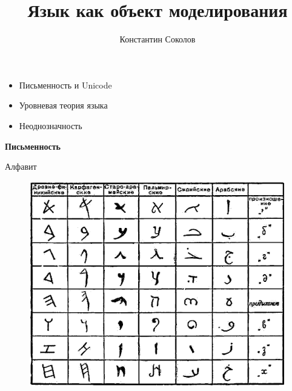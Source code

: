 \documentclass{beamer}
\begin{document}
\title{\large{\sc Язык как объект моделирования}}
\author{Константин Соколов}

\begin{frame}
    \thispagestyle{empty}
    \titlepage
\end{frame}

 

\begin{frame}{}
\begin{itemize}
	\item Письменность и Unicode
	\item Уровневая теория языка
	\item Неоднозначность
\end{itemize}
\end{frame}
 

\begin{frame}{}
\begin{center}
	\textbf{Письменность}
\end{center}
\end{frame}

\begin{frame}{Алфавит}
\begin{figure}[H]
\includegraphics[scale=0.4]{alphabet.png} 
\end{figure}
\end{frame}
\end{document}
